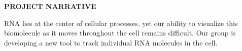 \begin{centering}
{\bf PROJECT NARRATIVE}
\end{centering}

RNA lies at the center of cellular processes, yet our ability to visualize this biomolecule as it moves throughout the cell remains difficult. Our group is developing a new tool to track individual RNA molecules in the cell. 

